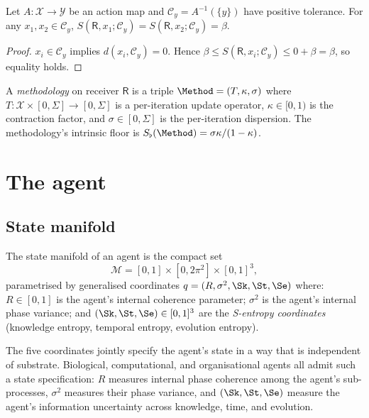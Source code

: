 \documentclass[11pt,twocolumn,a4paper]{article}
\newcommand{\X}{\mathcal{X}}
\newcommand{\Y}{\mathcal{Y}}
\newcommand{\Cell}{\mathcal{C}}
\newcommand{\receiver}{\mathsf{R}}
\newcommand{\Sfloor}{S_{\flat}}
\begin{document}
\begin{theorem}\label{thm:celltruth}
Let $A: \X \to \Y$ be an action map and $\Cell_y = A^{-1}(\{y\})$ have positive tolerance.
For any $x_1, x_2 \in \Cell_y$, $S(\receiver, x_1; \Cell_y) = S(\receiver, x_2; \Cell_y) = \beta$.
\end{theorem}

\begin{proof}
$x_i \in \Cell_y$ implies $d(x_i, \Cell_y) = 0$. Hence
$\beta \le S(\receiver, x_i; \Cell_y) \le 0 + \beta = \beta$, so equality holds.
\end{proof}

\begin{definition}[Methodology]\label{def:method}
A \emph{methodology} on receiver $\receiver$ is a triple $\Method = (T, \kappa, \sigma)$
where $T: \X \times [0, \Sigma] \to [0, \Sigma]$ is a per-iteration update operator,
$\kappa \in [0, 1)$ is the contraction factor, and $\sigma \in [0, \Sigma]$ is the
per-iteration dispersion. The methodology's intrinsic floor is
$\Sfloor(\Method) = \sigma \kappa / (1 - \kappa)$.
\end{definition}

\section{The agent}
\label{sec:agent}

\subsection{State manifold}

\begin{definition}\label{def:manifold}
The state manifold of an agent is the compact set
\[
\mathcal{M} = [0, 1] \times [0, 2\pi^2] \times [0, 1]^3,
\]
parametrised by generalised coordinates $q = (R, \sigma^2, \Sk, \St, \Se)$ where:
$R \in [0, 1]$ is the agent's internal coherence parameter; $\sigma^2$ is the agent's
internal phase variance; and $(\Sk, \St, \Se) \in [0, 1]^3$ are the
\emph{S-entropy coordinates} (knowledge entropy, temporal entropy, evolution entropy).
\end{definition}

The five coordinates jointly specify the agent's state in a way that is independent of
substrate. Biological, computational, and organisational agents all admit such a state
specification: $R$ measures internal phase coherence among the agent's sub-processes,
$\sigma^2$ measures their phase variance, and $(\Sk, \St, \Se)$ measure the agent's
information uncertainty across knowledge, time, and evolution.
\end{document}

